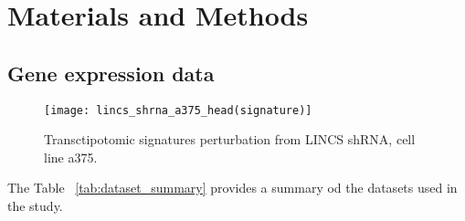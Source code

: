 
%


\chapter{Materials and Methods}
\label{cha:materials_and_methods}

\section{Gene expression data} %
\label{sec:gene_expression_data}




\begin{figure}[htbp]
    \centering
    \texttt{[image: lincs\_shrna\_a375\_head(signature)]}
    \caption{Transctipotomic signatures perturbation from LINCS shRNA, cell line a375.}
    \label{fig:example_signatures}
\end{figure}


The Table ~\ref{tab:dataset_summary} provides a summary od the datasets used in the study.

